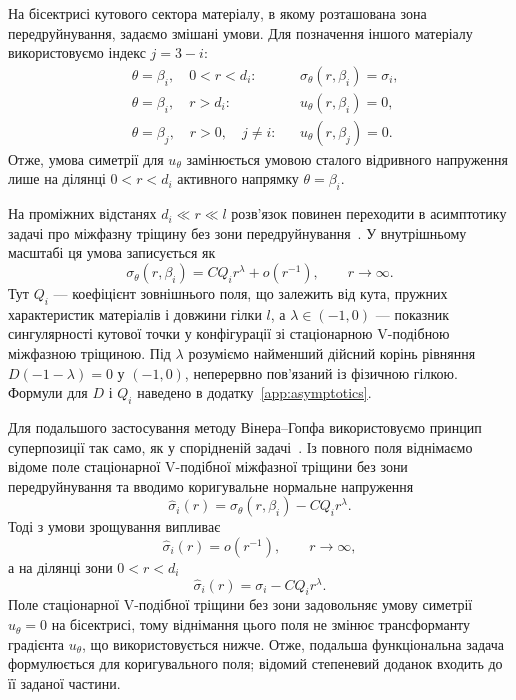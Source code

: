 На бісектрисі кутового сектора матеріалу, в якому розташована зона
передруйнування, задаємо змішані умови. Для позначення іншого матеріалу
використовуємо індекс $j=3-i$:
\begin{equation}
\label{eq:process-zone-boundary-conditions}
\begin{aligned}
  &\theta=\beta_i,\quad 0<r<d_i:
    &&\sigma_\theta(r,\beta_i)=\sigma_i,\\
  &\theta=\beta_i,\quad r>d_i:
    &&u_\theta(r,\beta_i)=0,\\
  &\theta=\beta_j,\quad r>0,\quad j\ne i:
    &&u_\theta(r,\beta_j)=0.
\end{aligned}
\end{equation}
Отже, умова симетрії для $u_\theta$ замінюється умовою сталого відривного
напруження лише на ділянці $0<r<d_i$ активного напрямку $\theta=\beta_i$.

На проміжних відстанях $d_i\ll r\ll l$ розв'язок повинен переходити в
асимптотику задачі про міжфазну тріщину без зони передруйнування~\cite{NazarenkoKipnis2022Stress}. У
внутрішньому масштабі ця умова записується як
\begin{equation}
\label{eq:matched-far-field}
  \sigma_\theta(r,\beta_i)
    =CQ_i r^\lambda+o\!\left(r^{-1}\right),
    \qquad r\to\infty.
\end{equation}
Тут $Q_i$ --- коефіцієнт зовнішнього поля, що залежить від кута,
пружних характеристик матеріалів і довжини гілки $l$, а
$\lambda\in(-1,0)$ --- показник сингулярності кутової точки у
конфігурації зі стаціонарною V-подібною міжфазною тріщиною. Під $\lambda$ розуміємо найменший
дійсний корінь рівняння $D(-1-\lambda)=0$ у $(-1,0)$, неперервно
пов'язаний із фізичною гілкою. Формули для $D$ і $Q_i$ наведено в
додатку~\ref{app:asymptotics}.

Для подальшого застосування методу Вінера--Гопфа використовуємо принцип
суперпозиції так само, як у спорідненій задачі~\cite{KaminskyDudykPolishchuk2024}.
Із повного поля віднімаємо відоме поле стаціонарної V-подібної
міжфазної тріщини без зони передруйнування та вводимо коригувальне
нормальне напруження
\begin{equation*}
  \widehat{\sigma}_i(r)
  =\sigma_\theta(r,\beta_i)-CQ_i r^\lambda .
\end{equation*}
Тоді з умови зрощування випливає
\begin{equation*}
  \widehat{\sigma}_i(r)=o(r^{-1}),
  \qquad r\to\infty,
\end{equation*}
а на ділянці зони $0<r<d_i$
\begin{equation*}
  \widehat{\sigma}_i(r)
  =\sigma_i-CQ_i r^\lambda.
\end{equation*}
Поле стаціонарної V-подібної тріщини без зони задовольняє умову
симетрії $u_\theta=0$ на бісектрисі,
тому віднімання цього поля не змінює трансформанту градієнта
$u_\theta$, що використовується нижче. Отже, подальша функціональна
задача формулюється для коригувального поля; відомий степеневий доданок
входить до її заданої частини.

